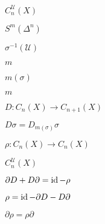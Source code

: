 \documentclass[10pt]{book}
\begin{document}
\begin{mdSnippets}
\begin{mdInlineSnippet}
$C_n^\mathcal{U}(X)$\end{mdInlineSnippet}%
\begin{mdInlineSnippet}[f0f971a02c8be6e924896886f0d33425]%
$S^m(\Delta^n)$\end{mdInlineSnippet}%
\begin{mdInlineSnippet}[f7170ae16468a99e1650c4b67c087e5d]%
$\sigma^{-1}(\mathcal{U})$\end{mdInlineSnippet}%
\begin{mdInlineSnippet}[6f8f57715090da2632453988d9a1501b]%
$m$\end{mdInlineSnippet}%
\begin{mdInlineSnippet}[262d18dc91428fc2e5d8184100839045]%
$m(\sigma)$\end{mdInlineSnippet}%
\begin{mdInlineSnippet}[6f8f57715090da2632453988d9a1501b]%
$m$\end{mdInlineSnippet}%
\begin{mdInlineSnippet}[3877e976fb1fac39dd8372c12c4a2512]%
$D: C_n(X) \to C_{n+1}(X)$\end{mdInlineSnippet}%
\begin{mdInlineSnippet}[aff51e18c983e8642d2a809c01fa5332]%
$D\sigma = D_{m(\sigma)}\sigma$\end{mdInlineSnippet}%
\begin{mdInlineSnippet}[895816816fed5d022ae5e83fc27269f2]%
$\rho: C_n(X) \to C_n(X)$\end{mdInlineSnippet}%
\begin{mdInlineSnippet}%
$C_n^\mathcal{U}(X)$\end{mdInlineSnippet}%
\begin{mdInlineSnippet}%
$\partial D + D \partial = \operatorname{id} - \rho$\end{mdInlineSnippet}%
\begin{mdInlineSnippet}[4a3bf155df190ad15e6fa998635fa688]%
$\rho = \operatorname{id} - \partial D - D \partial$\end{mdInlineSnippet}%
\begin{mdInlineSnippet}%
$\partial \rho = \rho \partial$\end{mdInlineSnippet}%

\end{mdSnippets}
\end{document}
